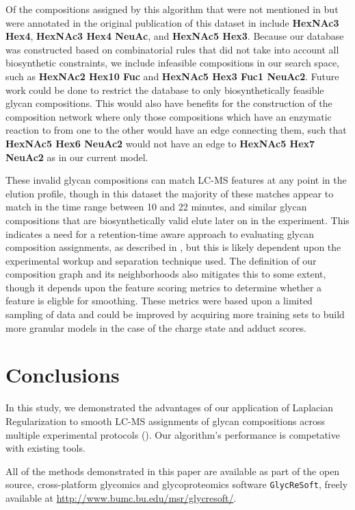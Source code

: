     Of the compositions assigned by this algorithm that were not
    mentioned in \cite{Yu2013} but were annotated in the original publication
    of this dataset in \cite{Hu2012} include \textbf{HexNAc3 Hex4},
    \textbf{HexNAc3 Hex4 NeuAc}, and \textbf{HexNAc5 Hex3}. Because our database
    was constructed based on combinatorial rules that did not take into account
    all biosynthetic constraints, we include infeasible compositions in our search
    space, such as \textbf{HexNAc2 Hex10 Fuc} and \textbf{HexNAc5 Hex3 Fuc1 NeuAc2}.
    Future work could be done to restrict the database to only biosynthetically
    feasible glycan compositions. This would also have benefits for the construction
    of the composition network where only those compositions which have an enzymatic
    reaction to from one to the other would have an edge connecting them, such that
    \textbf{HexNAc5 Hex6 NeuAc2} would not have an edge to \textbf{HexNAc5 Hex7 NeuAc2}
    as in our current model.
    
    These invalid glycan compositions can match LC-MS features at any point in
    the elution profile, though in this dataset the majority of these matches
    appear to match in the time range between 10 and 22 minutes, and similar glycan
    compositions that are biosynthetically valid elute later on in the experiment.
    This indicates a need for a retention-time aware approach to evaluating glycan
    composition assignments, as described in \cite{Hu2016}, but this is likely dependent
    upon the experimental workup and separation technique used. The definition of our
    composition graph and its neighborhoods also mitigates this to some extent, though
    it depends upon the feature scoring metrics to determine whether a feature is
    eligble for smoothing. These metrics were based upon a limited sampling of data
    and could be improved by acquiring more training sets to build more granular
    models in the case of the charge state and adduct scores.

\section{Conclusions}
    In this study, we demonstrated the advantages of our application of Laplacian
    Regularization to smooth LC-MS assignments of glycan compositions across multiple
    experimental protocols (\cite{Hu2012, Khatri2016a}). Our algorithm's performance is
    competative with existing tools.

    All of the methods demonstrated in this paper are available as part of the open source,
    cross-platform glycomics and glycoproteomics software \texttt{GlycReSoft}, freely
    available at \href{http://www.bumc.bu.edu/msr/glycresoft/}{http://www.bumc.bu.edu/msr/glycresoft/}.
